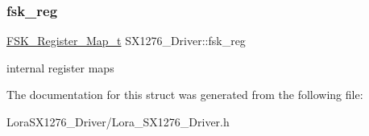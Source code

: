 \subsubsection{\texorpdfstring{fsk\+\_\+reg}{fsk\_reg}}
{\footnotesize\ttfamily \hyperlink{structFSK__Register__Map}{F\+S\+K\+\_\+\+Register\+\_\+\+Map\+\_\+t} S\+X1276\+\_\+\+Driver\+::fsk\+\_\+reg}

internal register maps 

The documentation for this struct was generated from the following file\+:\begin{DoxyCompactItemize}
\item 
Lora\+S\+X1276\+\_\+\+Driver/Lora\+\_\+\+S\+X1276\+\_\+\+Driver.\+h\end{DoxyCompactItemize}
